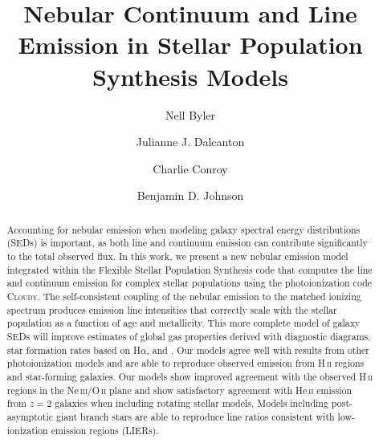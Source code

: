 \documentclass[linenumbers, tighten, trackchanges]{aastex61}%
\begin{document}
\title{Nebular Continuum and Line Emission in Stellar Population Synthesis Models}


\author[0000-0002-7392-3637]{Nell Byler}

\author[0000-0002-1264-2006]{Julianne J. Dalcanton}

\author[0000-0002-1590-8551]{Charlie Conroy}

\author{Benjamin D. Johnson}

\begin{abstract}
Accounting for nebular emission when modeling galaxy spectral energy distributions (SEDs) is important, as both line and continuum emission can contribute significantly to the total observed flux. In this work, we present a new nebular emission model integrated within the Flexible Stellar Population Synthesis code that computes the line and continuum emission for complex stellar populations using the photoionization code \textsc{Cloudy}. The self-consistent coupling of the nebular emission to the matched ionizing spectrum produces emission line intensities that correctly scale with the stellar population as a function of age and metallicity. This more complete model of galaxy SEDs will improve estimates of global gas properties derived with diagnostic diagrams, star formation rates based on H$\alpha$, and . Our models agree well with results from other photoionization models and are able to reproduce observed emission from H\,\textsc{ii} regions and star-forming galaxies. Our models show improved agreement with the observed H\,\textsc{ii} regions in the Ne\,\textsc{iii}/O\,\textsc{ii} plane and show satisfactory agreement with He\,\textsc{ii} emission from $z=2$ galaxies when including rotating stellar models. Models including post-asymptotic giant branch stars are able to reproduce line ratios consistent with low-ionization emission regions (LIERs). 
\end{abstract}
\end{document}
